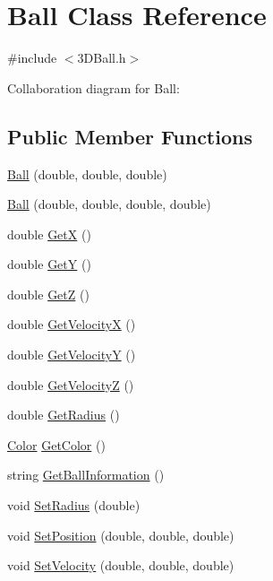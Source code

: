 \hypertarget{classBall}{\section{Ball Class Reference}
\label{classBall}
}


{\ttfamily \#include $<$3\+D\+Ball.\+h$>$}



Collaboration diagram for Ball\+:
\subsection*{Public Member Functions}
\begin{DoxyCompactItemize}
\item 
\hyperlink{classBall_a24c86c12194059668dd6414cadf4bc9f}{Ball} (double, double, double)
\item 
\hyperlink{classBall_ac0194e2f3b841756b7237e0d9c22967f}{Ball} (double, double, double, double)
\item 
double \hyperlink{classBall_ad24c7dfa22e546da923858a01d676565}{Get\+X} ()
\item 
double \hyperlink{classBall_a22cf86bf47aa58969cb7f2409fa15713}{Get\+Y} ()
\item 
double \hyperlink{classBall_afaa79e47006c9bbcb9adc612a2851ee7}{Get\+Z} ()
\item 
double \hyperlink{classBall_a5c91c38f628dccee0fd3010d792f32f0}{Get\+Velocity\+X} ()
\item 
double \hyperlink{classBall_adc7030f9f566eed0bec433ff059471d3}{Get\+Velocity\+Y} ()
\item 
double \hyperlink{classBall_a500ef8f18153571f859f9fec64320ae0}{Get\+Velocity\+Z} ()
\item 
double \hyperlink{classBall_a51717a85f2d8e073aed1d0a3765b9705}{Get\+Radius} ()
\item 
\hyperlink{classColor}{Color} \hyperlink{classBall_a8560830fd50768e3dea23ea6acb805e4}{Get\+Color} ()
\item 
string \hyperlink{classBall_a1262df24d9535780d0d1b5e84898873a}{Get\+Ball\+Information} ()
\item 
void \hyperlink{classBall_a686405761606ff9cb10f3dec4c15f6c7}{Set\+Radius} (double)
\item 
void \hyperlink{classBall_a9f7d9dd8c90321127eca7f74cf61898f}{Set\+Position} (double, double, double)
\item 
void \hyperlink{classBall_a5ae9588630dacbc7904c455bd5d8cd2a}{Set\+Velocity} (double, double, double)
\item 

\end{DoxyCompactItemize}
